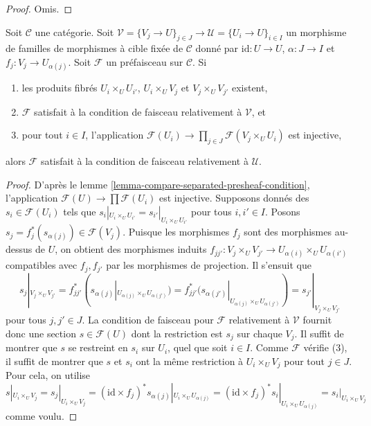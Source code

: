 \begin{proof}
Omis.
\end{proof}

\begin{lemma}
\label{lemma-compare-sheaf-condition}
Soit $\mathcal{C}$ une catégorie. Soit
$\mathcal{V} = \{V_j \to U\}_{j \in J} \to
\mathcal{U} = \{U_i \to U\}_{i \in I}$ un morphisme de familles de
morphismes à cible fixée de $\mathcal{C}$ donné par
$\text{id} : U \to U$, $\alpha : J \to I$ et
$f_j : V_j \to U_{\alpha(j)}$. Soit $\mathcal{F}$ un préfaisceau sur
$\mathcal{C}$. Si
\begin{enumerate}
\item les produits fibrés $U_i \times_U U_{i'}$, $U_i \times_U V_j$ et
$V_j \times_U V_{j'}$ existent,
\item $\mathcal{F}$ satisfait à la condition de faisceau relativement à
$\mathcal{V}$, et
\item pour tout $i \in I$, l’application
$\mathcal{F}(U_i) \to \prod_{j \in J} \mathcal{F}(V_j \times_U U_i)$ est
injective,
\end{enumerate}
alors $\mathcal{F}$ satisfait à la condition de faisceau relativement à
$\mathcal{U}$.
\end{lemma}

\begin{proof}
D’après le lemme \ref{lemma-compare-separated-presheaf-condition},
l’application $\mathcal{F}(U) \to \prod \mathcal{F}(U_i)$ est injective.
Supposons donnés des $s_i \in \mathcal{F}(U_i)$ tels que
$s_i|_{U_i \times_U U_{i'}} = s_{i'}|_{U_i \times_U U_{i'}}$ pour tous
$i, i' \in I$. Posons
$s_j = f_j^*(s_{\alpha(j)}) \in \mathcal{F}(V_j)$. Puisque les morphismes
$f_j$ sont des morphismes au-dessus de $U$, on obtient des morphismes induits
$f_{jj'} : V_j \times_U V_{j'} \to
U_{\alpha(i)} \times_U U_{\alpha(i')}$ compatibles avec $f_j, f_{j'}$ par
les morphismes de projection. Il s’ensuit que
$$
s_j|_{V_j \times_U V_{j'}}
= f_{jj'}^*(s_{\alpha(j)}|_{U_{\alpha(j)} \times_U U_{\alpha(j')}})
= f_{jj'}^*(s_{\alpha(j')}|_{U_{\alpha(j)} \times_U U_{\alpha(j')}})
= s_{j'}|_{V_j \times_U V_{j'}}
$$
pour tous $j, j' \in J$. La condition de faisceau pour $\mathcal{F}$
relativement à $\mathcal{V}$ fournit donc une section
$s \in \mathcal{F}(U)$ dont la restriction est $s_j$ sur chaque $V_j$. Il
suffit de montrer que $s$ se restreint en $s_i$ sur $U_i$, quel que soit
$i \in I$. Comme $\mathcal{F}$ vérifie (3), il suffit de montrer que $s$ et
$s_i$ ont la même restriction à $U_i \times_U V_j$ pour tout $j \in J$.
Pour cela, on utilise
$$
s|_{U_i \times_U V_j} = s_j|_{U_i \times_U V_j} =
(\text{id} \times f_j)^*s_{\alpha(j)}|_{U_i \times_U U_{\alpha(j)}} =
(\text{id} \times f_j)^*s_i|_{U_i \times_U U_{\alpha(j)}} =
s_i|_{U_i \times_U V_j}
$$
comme voulu.
\end{proof}

